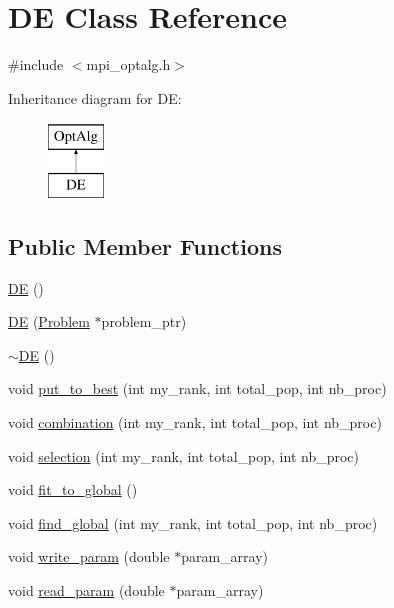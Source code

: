 \hypertarget{class_d_e}{}\section{D\+E Class Reference}
\label{class_d_e}


{\ttfamily \#include $<$mpi\+\_\+optalg.\+h$>$}

Inheritance diagram for D\+E\+:\begin{figure}[H]
\begin{center}
\leavevmode
\includegraphics[height=2.000000cm]{class_d_e}
\end{center}
\end{figure}
\subsection*{Public Member Functions}
\begin{DoxyCompactItemize}
\item 
\hyperlink{class_d_e_a37d9ef0ccffda10dda67b29538416d0c}{D\+E} ()
\item 
\hyperlink{class_d_e_a1f05cc6409494dee6f1a51f3b8fffb33}{D\+E} (\hyperlink{class_problem}{Problem} $\ast$problem\+\_\+ptr)
\item 
\hyperlink{class_d_e_a4b8e660c52c49eb75f6c0015865cea86}{$\sim$\+D\+E} ()
\item 
void \hyperlink{class_d_e_a2ff7cab053965600e264c8aaa20a5e98}{put\+\_\+to\+\_\+best} (int my\+\_\+rank, int total\+\_\+pop, int nb\+\_\+proc)
\item 
void \hyperlink{class_d_e_a75bbf1f66249014230af0c36b1692da6}{combination} (int my\+\_\+rank, int total\+\_\+pop, int nb\+\_\+proc)
\item 
void \hyperlink{class_d_e_aa7db64e161c9c0a8faa18fe54319f723}{selection} (int my\+\_\+rank, int total\+\_\+pop, int nb\+\_\+proc)
\item 
void \hyperlink{class_d_e_a92e6613371643726878322829ce006e9}{fit\+\_\+to\+\_\+global} ()
\item 
void \hyperlink{class_d_e_a2975856172cbfa1512919986dcf5a87f}{find\+\_\+global} (int my\+\_\+rank, int total\+\_\+pop, int nb\+\_\+proc)
\item 
void \hyperlink{class_d_e_a07523caeeac589fc632a8aa87c8305dd}{write\+\_\+param} (double $\ast$param\+\_\+array)
\item 
void \hyperlink{class_d_e_a1ad5a8387091099c20f455ad30afb505}{read\+\_\+param} (double $\ast$param\+\_\+array)
\end{DoxyCompactItemize}
